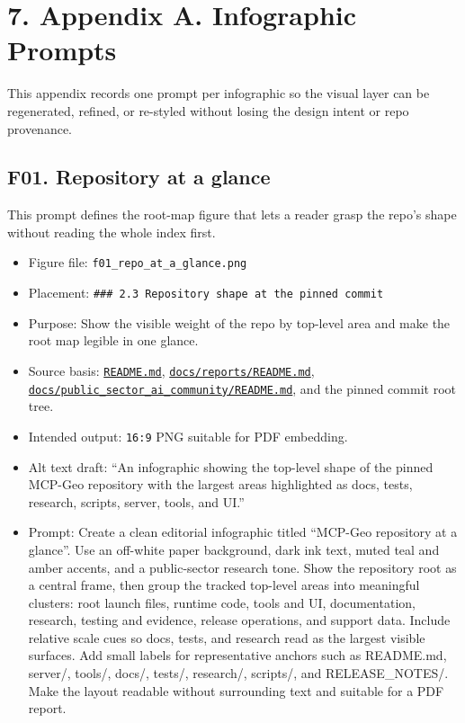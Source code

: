 \section{7. Appendix A. Infographic
Prompts}\label{appendix-a.-infographic-prompts}

This appendix records one prompt per infographic so the visual layer can
be regenerated, refined, or re-styled without losing the design intent
or repo provenance.

\subsection{F01. Repository at a
glance}\label{f01.-repository-at-a-glance}

This prompt defines the root-map figure that lets a reader grasp the
repo's shape without reading the whole index first.

\begin{itemize}
\tightlist
\item
  Figure file: \texttt{f01\_repo\_at\_a\_glance.png}
\item
  Placement:
  \texttt{\#\#\#\ 2.3\ Repository\ shape\ at\ the\ pinned\ commit}
\item
  Purpose: Show the visible weight of the repo by top-level area and
  make the root map legible in one glance.
\item
  Source basis:
  \href{https://github.com/chris-page-gov/mcp-geo/blob/fe862910da246ca77f374cfbe484985f5df4d316/README.md}{\texttt{README.md}},
  \href{https://github.com/chris-page-gov/mcp-geo/blob/fe862910da246ca77f374cfbe484985f5df4d316/docs/reports/README.md}{\texttt{docs/reports/README.md}},
  \href{https://github.com/chris-page-gov/mcp-geo/blob/fe862910da246ca77f374cfbe484985f5df4d316/docs/public_sector_ai_community/README.md}{\texttt{docs/public\_sector\_ai\_community/README.md}},
  and the pinned commit root tree.
\item
  Intended output: \texttt{16:9} PNG suitable for PDF embedding.
\item
  Alt text draft: ``An infographic showing the top-level shape of the
  pinned MCP-Geo repository with the largest areas highlighted as docs,
  tests, research, scripts, server, tools, and UI.''
\item
  Prompt: Create a clean editorial infographic titled ``MCP-Geo
  repository at a glance''. Use an off-white paper background, dark ink
  text, muted teal and amber accents, and a public-sector research tone.
  Show the repository root as a central frame, then group the tracked
  top-level areas into meaningful clusters: root launch files, runtime
  code, tools and UI, documentation, research, testing and evidence,
  release operations, and support data. Include relative scale cues so
  docs, tests, and research read as the largest visible surfaces. Add
  small labels for representative anchors such as README.md, server/,
  tools/, docs/, tests/, research/, scripts/, and RELEASE\_NOTES/. Make
  the layout readable without surrounding text and suitable for a PDF
  report.
\end{itemize}

